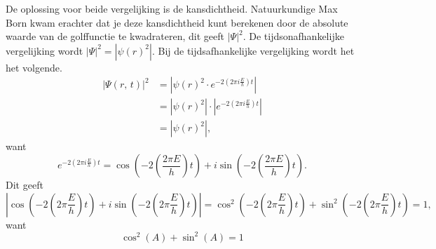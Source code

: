 \documentclass[11pt,fleqn]{book} %
\begin{document}
De oplossing voor beide vergelijking is de kansdichtheid. Natuurkundige Max Born kwam erachter dat je deze kansdichtheid kunt berekenen door de absolute waarde van de golffunctie te kwadrateren, dit geeft ${\left|\Psi\right|}^2$. De tijdsonafhankelijke vergelijking wordt ${\left|\Psi\right|}^2=\left|{\psi(r)}^2\right|$. Bij de tijdsafhankelijke vergelijking wordt het het volgende.
\begin{align}\label{eq:psipsi}
{\left|\Psi(r,\,t)\right|}^2 &=\left|{\psi(r)}^2\cdot e^{-2(2\pi i \frac{E}{h})t}\right|\nonumber\\
&=\left|{\psi(r)}^2\right|\cdot\left|e^{-2(2\pi i\frac{E}{h})t}\right|\nonumber\\
&=\left|{\psi(r)}^2\right|,
\end{align}
want
\begin{displaymath}
e^{-2(2\pi i \frac{E}{h})t}=\cos{\left(-2\left(\frac{2\pi E}{h}\right)t\right)}+i\sin{\left(-2\left(\frac{2\pi E}{h}\right)t\right)}.
\end{displaymath}
Dit geeft
\begin{displaymath}
\left|\cos{\left(-2\left(2\pi\frac{E}{h}\right)t\right)}+i\sin{\left(-2\left(2\pi\frac{E}{h}\right)t\right)}\right|=\cos^2{\left(-2\left(2\pi\frac{E}{h}\right)t\right)}+\sin^2{\left(-2\left(2\pi\frac{E}{h}\right)t\right)}=1,
\end{displaymath}
want
\begin{displaymath}
\cos^2{\left(A\right)}+\sin^2{\left(A\right)}=1
\end{displaymath}
\end{document}
